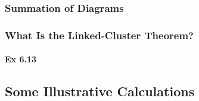 \documentclass[a4paper]{article}
\newcommand{\ex}[1]{\paragraph{Ex #1}}
\numberwithin{equation}{subsection}
\begin{document}
\subsubsection{Summation of Diagrams}

\subsubsection{What Is the Linked-Cluster Theorem?}
\ex{6.13}

\subsection{Some Illustrative Calculations}
\end{document}
